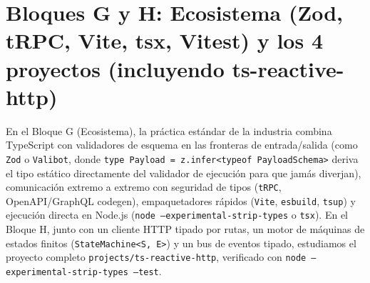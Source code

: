 \documentclass{book}
\begin{document}
\section{Bloques G y H: Ecosistema (Zod, tRPC, Vite, tsx, Vitest) y los 4 proyectos (incluyendo ts-reactive-http)}

En el Bloque G (Ecosistema), la práctica estándar de la industria combina TypeScript con validadores de esquema en las fronteras de entrada/salida (como \texttt{Zod} o \texttt{Valibot}, donde \texttt{type Payload = z.infer<typeof PayloadSchema>} deriva el tipo estático directamente del validador de ejecución para que jamás diverjan), comunicación extremo a extremo con seguridad de tipos (\texttt{tRPC}, OpenAPI/GraphQL codegen), empaquetadores rápidos (\texttt{Vite}, \texttt{esbuild}, \texttt{tsup}) y ejecución directa en Node.js (\texttt{node --experimental-strip-types} o \texttt{tsx}). En el Bloque H, junto con un cliente HTTP tipado por rutas, un motor de máquinas de estados finitos (\texttt{StateMachine<S, E>}) y un bus de eventos tipado, estudiamos el proyecto completo \texttt{projects/ts-reactive-http}, verificado con \texttt{node --experimental-strip-types --test}.
\end{document}
